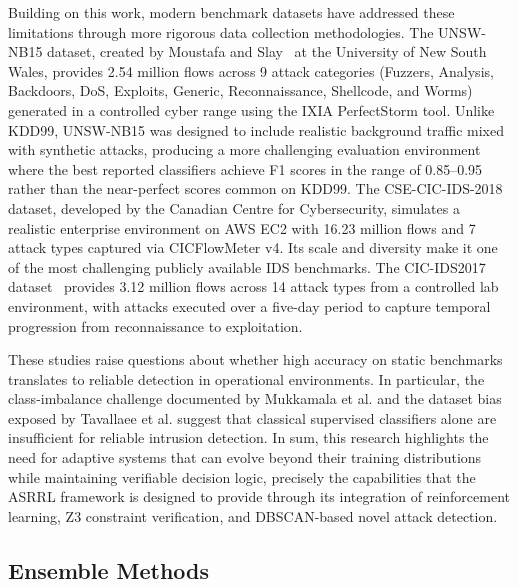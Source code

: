 \documentclass[12pt, letterpaper, oneside]{report}
\newcommand{\ASRRL}{\textsc{ASRRL}}
\begin{document}
Building on this work, modern benchmark datasets have addressed these limitations through more rigorous data collection methodologies. The UNSW-NB15 dataset, created by Moustafa and Slay~\cite{moustafa2015} at the University of New South Wales, provides 2.54 million flows across 9 attack categories (Fuzzers, Analysis, Backdoors, DoS, Exploits, Generic, Reconnaissance, Shellcode, and Worms) generated in a controlled cyber range using the IXIA PerfectStorm tool. Unlike KDD99, UNSW-NB15 was designed to include realistic background traffic mixed with synthetic attacks, producing a more challenging evaluation environment where the best reported classifiers achieve F1 scores in the range of 0.85--0.95 rather than the near-perfect scores common on KDD99. The CSE-CIC-IDS-2018 dataset, developed by the Canadian Centre for Cybersecurity, simulates a realistic enterprise environment on AWS EC2 with 16.23 million flows and 7 attack types captured via CICFlowMeter v4. Its scale and diversity make it one of the most challenging publicly available IDS benchmarks. The CIC-IDS2017 dataset~\cite{sharafaldin2018} provides 3.12 million flows across 14 attack types from a controlled lab environment, with attacks executed over a five-day period to capture temporal progression from reconnaissance to exploitation.

These studies raise questions about whether high accuracy on static benchmarks translates to reliable detection in operational environments. In particular, the class-imbalance challenge documented by Mukkamala et al. and the dataset bias exposed by Tavallaee et al. suggest that classical supervised classifiers alone are insufficient for reliable intrusion detection. In sum, this research highlights the need for adaptive systems that can evolve beyond their training distributions while maintaining verifiable decision logic, precisely the capabilities that the \ASRRL{} framework is designed to provide through its integration of reinforcement learning, Z3 constraint verification, and DBSCAN-based novel attack detection.

\subsection{Ensemble Methods}
\end{document}
